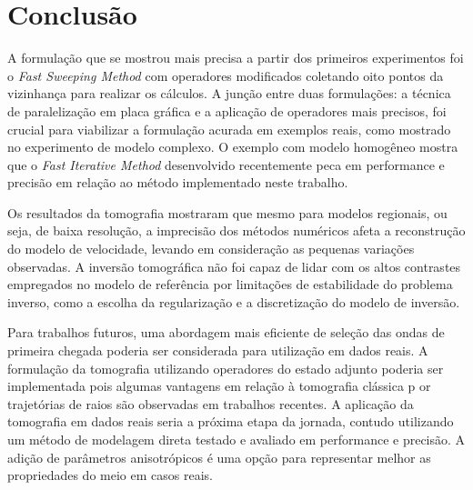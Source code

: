 \chapter{Conclusão}
\label{ch:conclusao}

A formulação que se mostrou mais precisa a partir dos primeiros experimentos foi o \textit{Fast Sweeping Method} com operadores modificados coletando oito pontos da vizinhança para realizar os cálculos. A junção entre duas formulações: a técnica de paralelização em placa gráfica e a aplicação de operadores mais precisos, foi crucial para viabilizar a formulação acurada em exemplos reais, como mostrado no experimento de modelo complexo. O exemplo com modelo homogêneo mostra que o \textit{Fast Iterative Method} desenvolvido recentemente peca em performance e precisão em relação ao método implementado neste trabalho.  

Os resultados da tomografia mostraram que mesmo para modelos regionais, ou seja, de baixa resolução, a imprecisão dos métodos numéricos afeta a reconstrução do modelo de velocidade, levando em consideração as pequenas variações observadas. A inversão tomográfica não foi capaz de lidar com os altos contrastes empregados no modelo de referência por limitações de estabilidade do problema inverso, como a escolha da regularização e a discretização do modelo de inversão. 

Para trabalhos futuros, uma abordagem mais eficiente de seleção das ondas de primeira chegada poderia ser considerada para utilização em dados reais. A formulação da tomografia utilizando operadores do estado adjunto poderia ser implementada pois algumas vantagens em relação à tomografia clássica p or trajetórias de raios são observadas em trabalhos recentes. A aplicação da tomografia em dados reais seria a próxima etapa da jornada, contudo utilizando um método de modelagem direta testado e avaliado em performance e precisão. A adição de parâmetros anisotrópicos é uma opção para representar melhor as propriedades do meio em casos reais. 

